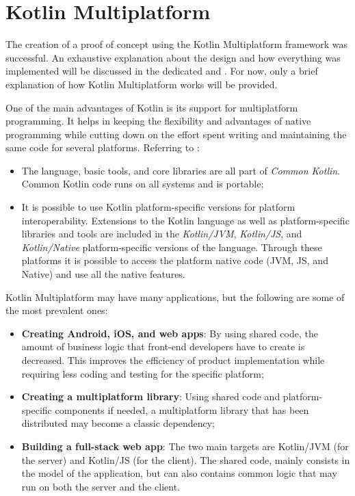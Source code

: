 \section{Kotlin Multiplatform}
\label{sec:kotlin-multiplatform}

\begin{info}[Anticipation:]
	The creation of a proof of concept using the Kotlin Multiplatform framework was successful. An exhaustive explanation about the design and how everything was implemented will be discussed in the dedicated  and . For now, only a brief explanation of how Kotlin Multiplatform works will be provided.
\end{info}

One of the main advantages of Kotlin is its support for multiplatform programming. It helps in keeping the flexibility and advantages of native programming while cutting down on the effort spent writing and maintaining the same code for several platforms. Referring to :


\begin{itemize}
	\item The language, basic tools, and core libraries are all part of \emph{Common Kotlin}. Common Kotlin code runs on all systems and is portable;
	\item It is possible to use Kotlin platform-specific versions for platform interoperability. Extensions to the Kotlin language as well as platform-specific libraries and tools are included in the \emph{Kotlin/JVM}, \emph{Kotlin/JS}, and \emph{Kotlin/Native} platform-specific versions of the language. Through these platforms it is possible to access the platform native code (JVM, JS, and Native) and use all the native features.
\end{itemize}

Kotlin Multiplatform may have many applications, but the following are some of the most prevalent ones:

\begin{itemize}
	\item \textbf{Creating Android, iOS, and web apps}: By using shared code, the amount of business logic that front-end developers have to create is decreased. This improves the efficiency of product implementation while requiring less coding and testing for the specific platform;
	\item \textbf{Creating a multiplatform library}: Using shared code and platform-specific components if needed, a multiplatform library that has been distributed may become a classic dependency;
	\item \textbf{Building a full-stack web app}: The two main targets are Kotlin/JVM (for the server) and Kotlin/JS (for the client). The shared code, mainly consists in the model of the application, but can also contains common logic that may run on both the server and the client.
\end{itemize}

